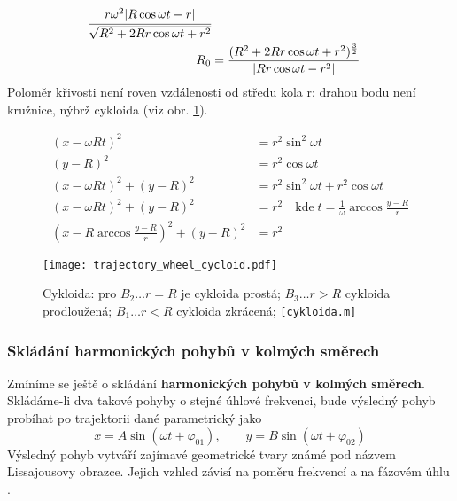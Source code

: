 \begin{example}
\begin{itemize}
\begin{align*}
                         {\cfrac{r\omega^2|R\cos\omega t - r|}
                         {\sqrt{R^2 + 2Rr\cos\omega t + r^2}}}                                  \\
                  R_0 &=  \frac{(R^2 + 2Rr\cos\omega t + r^2)^
                         {\frac{3}{2}}}{|Rr\cos\omega t - r^2|}
              \end{align*}
              Poloměr křivosti není roven vzdálenosti od středu kola r: drahou bodu není
              kružnice, nýbrž cykloida (viz obr. \ref{mech:fig_wheel_cycloid}).
          \end{itemize}
          \begin{align*}
            (x - \omega R t)^2            &= r^2\sin^2\omega t                          \\
            (y-R)^2                       &= r^2\cos\omega t                            \\
            (x - \omega R t)^2 + (y-R)^2  &= r^2\sin^2\omega t + r^2\cos\omega t        \\
            (x - \omega R t)^2 + (y-R)^2  &= r^2 \quad \text{kde}\; t = 
                                             \frac{1}{\omega}\arccos\frac{y-R}{r}       \\
            \left(x - R\arccos\frac{y-R}{r}\right)^2 + (y-R)^2  &= r^2
          \end{align*}
          \begin{figure}[ht!]
            \centering
            \texttt{[image: trajectory\_wheel\_cycloid.pdf]}
            \caption[Cykloida]{Cykloida: pro $B_2\ldots r=R$ je cykloida prostá; $B_3\ldots r>R$
                               cykloida prodloužená; $B_1\ldots r<R$ cykloida zkrácená;
                               \texttt{[cykloida.m]} }
            \label{mech:fig_wheel_cycloid}
          \end{figure}
        \end{example}
          
    \subsubsection{Skládání harmonických pohybů v kolmých směrech}
      Zmíníme se ještě o skládání \textbf{harmonických pohybů v kolmých smě\-rech}. Sklá\-dá\-me-li dva 
      takové pohyby o stejné úhlové frekvenci, bude výsledný pohyb probíhat po trajektorii dané parametrický 
      jako
      \begin{equation}\label{mech:eq_lissaujous1}
          x=A\sin(\omega t+\varphi_{01}),\qquad y=B\sin(\omega t +\varphi_{02})
      \end{equation}
      Výsledný pohyb vytváří zajímavé geometrické tvary známé pod názvem Lissajousovy obrazce. Jejich vzhled 
      závisí na poměru frekvencí a na fázovém úhlu \cite{Okrouhlik}.


